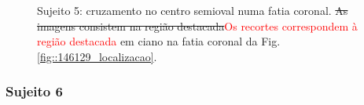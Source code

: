  \begin{figure}[H]
\centering
    \hfill
    \caption{Sujeito 5: cruzamento no centro semioval numa fatia coronal. \sout{As imagens consistem na região destacada}\textcolor{red}{Os recortes correspondem à região destacada} em ciano na fatia coronal da Fig. \ref{fig::146129_localizacao}.
    }
    \label{fig::146129_crossing}
\end{figure}

\subsubsection{Sujeito 6}
\label{sssec::sujeito_6}

